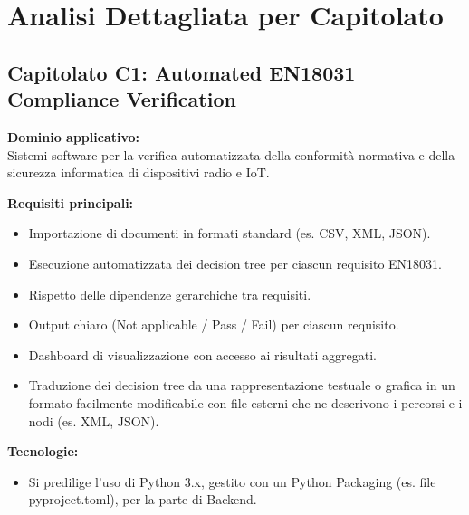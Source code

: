 \section{Analisi Dettagliata per Capitolato}

\subsection{Capitolato C1: {Automated EN18031 Compliance Verification} }

\textbf{Dominio applicativo:} \\
{Sistemi software per la verifica automatizzata della conformità normativa e della sicurezza informatica di dispositivi radio e IoT.}

\vspace{0.3cm}
\textbf{Requisiti principali:}
\begin{itemize}
	\item {Importazione di documenti in formati standard (es. CSV, XML, JSON).}
	\item {Esecuzione automatizzata dei decision tree per ciascun requisito EN18031.}
    \item Rispetto delle dipendenze gerarchiche tra requisiti.
    \item Output chiaro (Not applicable / Pass / Fail) per ciascun requisito.
    \item Dashboard di visualizzazione con accesso ai risultati aggregati.
    \item Traduzione dei decision tree da una rappresentazione testuale o grafica in
un formato facilmente modificabile con file esterni che ne descrivono i
percorsi e i nodi (es. XML, JSON).
\end{itemize}

\vspace{0.3cm}
\textbf{Tecnologie:}
\begin{itemize}
	\item {Si predilige l’uso di Python 3.x, gestito con un
Python Packaging (es. file pyproject.toml), per la parte di Backend.}
\end{itemize}

